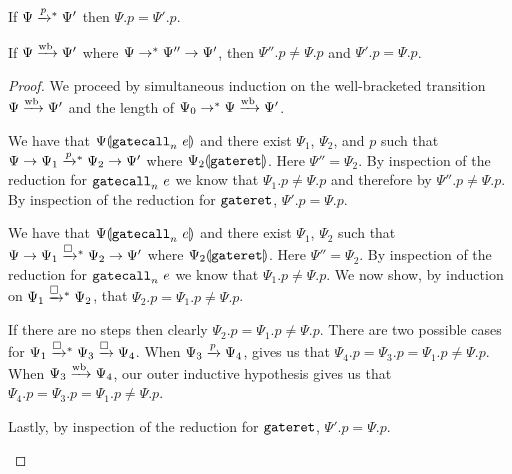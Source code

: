 \begin{lemma} \label{lemma:appendix:nacl:pstep-nogate}
  If $\Psi \steppstar{p} \Psi'$ then $\Psi.p = \Psi'.p$.
\end{lemma}

\begin{lemma} \label{lemma:appendix:nacl:wb-flips-priv}
  If $\Psi \mathrel{\xrightarrow{\!\text{wb}}} \Psi'$ where $\Psi \mathrel{\mathrel{\rightarrow}^{\ast}} \Psi'' \mathrel{\rightarrow} \Psi'$, then $\Psi''.p \neq \Psi.p$ and $\Psi'.p = \Psi.p$.
\end{lemma}
\begin{proof}
  We proceed by simultaneous induction on the well-bracketed transition $\Psi \mathrel{\xrightarrow{\!\text{wb}}} \Psi'$ and the length of $\Psi_0 \mathrel{\mathrel{\rightarrow}^{\ast}} \Psi \mathrel{\xrightarrow{\!\text{wb}}} \Psi'$.

  \begin{itemize}

      We have that ${\Psi}\llparenthesis{\ensuremath{\mathtt{gatecall}_{n}\ {e}}}\rrparenthesis$ and there exist $\Psi_1$, $\Psi_2$, and $p$ such that $\Psi \step \Psi_1 \steppstar{p} \Psi_2 \step \Psi'$ where ${\Psi_2}\llparenthesis{\ensuremath{\mathtt{gateret}}}\rrparenthesis$.
      Here $\Psi'' = \Psi_2$.
      By inspection of the reduction for $\mathtt{gatecall}_{n}\ {e}$ we know that $\Psi_1.p \neq \Psi.p$ and therefore by  $\Psi''.p \neq \Psi.p$.
      By inspection of the reduction for $\mathtt{gateret}$, $\Psi'.p = \Psi.p$.


      We have that ${\Psi}\llparenthesis{\ensuremath{\mathtt{gatecall}_{n}\ {e}}}\rrparenthesis$ and there exist $\Psi_1$, $\Psi_2$  such that $\Psi \step \Psi_1 \stepboxstar \Psi_2 \step \Psi'$ where ${\Psi_2}\llparenthesis{\ensuremath{\mathtt{gateret}}}\rrparenthesis$.
      Here $\Psi'' = \Psi_2$.
      By inspection of the reduction for $\mathtt{gatecall}_{n}\ {e}$ we know that $\Psi_1.p \neq \Psi.p$.
      We now show, by induction on $\Psi_1 \stepboxstar \Psi_2$, that $\Psi_2.p = \Psi_1.p \neq \Psi.p$.

      \begin{subproof}
        If there are no steps then clearly $\Psi_2.p = \Psi_1.p \neq \Psi.p$.
        There are two possible cases for $\Psi_1 \stepboxstar \Psi_3 \stepbox \Psi_4$.
        When $\Psi_3 \mathrel{\xrightarrow{p}} \Psi_4$,  gives us that $\Psi_4.p = \Psi_3.p = \Psi_1.p \neq \Psi.p$.
        When $\Psi_3 \mathrel{\xrightarrow{\!\text{wb}}} \Psi_4$, our outer inductive hypothesis gives us that $\Psi_4.p = \Psi_3.p = \Psi_1.p \neq \Psi.p$.
      \end{subproof}

      Lastly, by inspection of the reduction for $\mathtt{gateret}$, $\Psi'.p = \Psi.p$.
  \end{itemize}
\end{proof}

